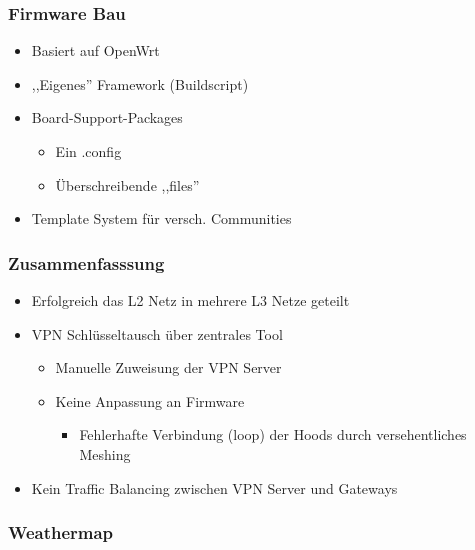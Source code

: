 \begin{frame}
\frametitle{Firmware Bau}
    \begin{itemize}
        \item Basiert auf OpenWrt
        \item ,,Eigenes'' Framework (Buildscript)
        \item Board-Support-Packages
        \begin{itemize}
            \item Ein .config
            \item Überschreibende ,,files''
        \end{itemize}
        \item Template System für versch. Communities
    \end{itemize}
\end{frame}

\begin{frame}
\frametitle{Zusammenfasssung}
    \begin{itemize}
        \item Erfolgreich das L2 Netz in mehrere L3 Netze geteilt
        \item VPN Schlüsseltausch über zentrales Tool
        \begin{itemize}
            \item Manuelle Zuweisung der VPN Server
            \item Keine Anpassung an Firmware
            \begin{itemize}
                \item Fehlerhafte Verbindung (loop) der Hoods durch versehentliches Meshing
            \end{itemize}
        \end{itemize}
        \item Kein Traffic Balancing zwischen VPN Server und Gateways
    \end{itemize}
\end{frame}


\begin{frame}
\frametitle{Weathermap}

\end{frame}